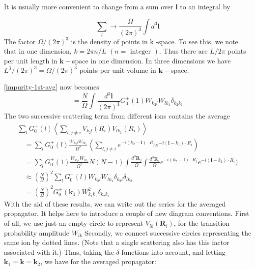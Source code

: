 It is usually more convenient to change from a sum over $\mathbf{l}$ to an integral by
\begin{imp}
\begin{equation}\sum_{l} \rightarrow \frac{\Omega}{(2 \pi)^{3}} \int d^{3} \mathbf{l}\end{equation}
The factor $\Omega /(2 \pi)^{3}$ is the density of points in $\mathrm{k}$ -space. To see this, we note that in one dimension, $k=2 \pi n / L$ $(n=\text { integer }) .$ Thus there are $L / 2 \pi$ points per unit length in $\mathbf{k}-$space in one dimension. In three dimensions we have $L^3/(2\pi)^3=\Omega/(2\pi)^3$ points per unit volume in $\mathbf{k}-$space.
\end{imp}
\ref{impurity-1st-avg} now becomes
$$=\frac{N}{\Omega} \int \frac{d^{3} \mathbf{l}}{(2 \pi)^{3}} G_{0}^{+}(1) W_{k_{2}l} W_{l k_{1}} \delta_{k_{2} k_{1}}$$
The two successive scattering term from different ions contains the average 
$$\begin{array}{l}
\sum_{l} G_{0}^{+}(l)\left\langle\sum_{l, j\neq i} V_{k_{2} l}\left(R_{i}\right) V_{lk_1}{\left(R_{i}\right)}\right\rangle \\
\quad=\sum_{l} G_{0}^{+}(l) \frac{W_{k_{2} l} W_{l k_{1}}}{\Omega^{2}}\left\langle\sum_{l, j \neq i} e^{-i\left(k_{2}-\mathbf{l}\right) \cdot R_{j}} e^{-i\left(\mathbf{l}-k_{1}\right) \cdot R_{i}}\right)\\
\quad=\sum_{l} G_{0}^{+}(1) \frac{W_{k_{2} l} W_{l k_{1}}}{\Omega^{2}} N(N-1)\int \frac{d^{3} \mathbf{R}_{j}}{\Omega} \int \frac{d^{3} \mathbf{R}_{i}}{\Omega}e^{-i\left(k_{2}-\mathbf{l}\right) \cdot R_{j}} e^{-i(\mathbf{l}-k_{1}) \cdot R_{i}})\\
\quad\approx\left(\frac{N}{\Omega}\right)^{2} \sum_{l} G_{0}^{+}(l) W_{k_{2} l} W_{l k_{1}} \delta_{k_{2} l} \delta_{l k_{2}}\\
\quad=\left(\frac{N}{\Omega}\right)^{2} G_{0}^{+}\left(\mathbf{k}_{1}\right) W_{k_{1} k_{1}}^{2} \delta_{k_{2} k_{1}}
\end{array}$$
With the aid of these results, we can write out the series for the averaged propagator. It helps here to introduce a couple of new diagram conventions. First of all, we use just an empty circle to represent $V_{lk}(\mathbf{R}_i)$, for the transition probability amplitude $W_{lk}$ Secondly,  we connect successive circles representing the same ion by dotted
lines. (Note that a single scattering also has this factor associated with it.) Thus, taking the $\delta$-functions into account, and letting $\mathbf{k}_1=\mathbf{k}=\mathbf{k}_2$, we have for the averaged propagator:

